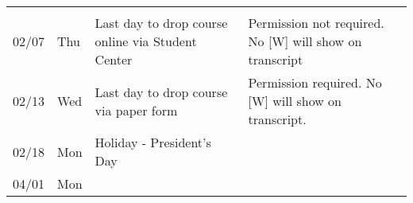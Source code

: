 \begin{longtable}[]{@{}llll@{}}
\begin{minipage}[t]{0.38\columnwidth}
\strut
\end{minipage}\tabularnewline
\begin{minipage}[t]{0.05\columnwidth}\raggedright
02/07\strut
\end{minipage} & \begin{minipage}[t]{0.03\columnwidth}\raggedright
Thu\strut
\end{minipage} & \begin{minipage}[t]{0.43\columnwidth}\raggedright
Last day to drop course online via Student Center\strut
\end{minipage} & \begin{minipage}[t]{0.38\columnwidth}\raggedright
Permission not required. No {[}W{]} will show on transcript\strut
\end{minipage}\tabularnewline
\begin{minipage}[t]{0.05\columnwidth}\raggedright
02/13\strut
\end{minipage} & \begin{minipage}[t]{0.03\columnwidth}\raggedright
Wed\strut
\end{minipage} & \begin{minipage}[t]{0.43\columnwidth}\raggedright
Last day to drop course via paper form\strut
\end{minipage} & \begin{minipage}[t]{0.38\columnwidth}\raggedright
Permission required. No {[}W{]} will show on transcript.\strut
\end{minipage}\tabularnewline
\begin{minipage}[t]{0.05\columnwidth}\raggedright
02/18\strut
\end{minipage} & \begin{minipage}[t]{0.03\columnwidth}\raggedright
Mon\strut
\end{minipage} & \begin{minipage}[t]{0.43\columnwidth}\raggedright
Holiday - President's Day\strut
\end{minipage} & \begin{minipage}[t]{0.38\columnwidth}\raggedright
\strut
\end{minipage}\tabularnewline
\begin{minipage}[t]{0.05\columnwidth}\raggedright
04/01\strut
\end{minipage} & \begin{minipage}[t]{0.03\columnwidth}\raggedright
Mon\strut
\end{minipage} & \begin{minipage}[t]{0.43\columnwidth}\raggedright

\end{minipage}
\end{longtable}
